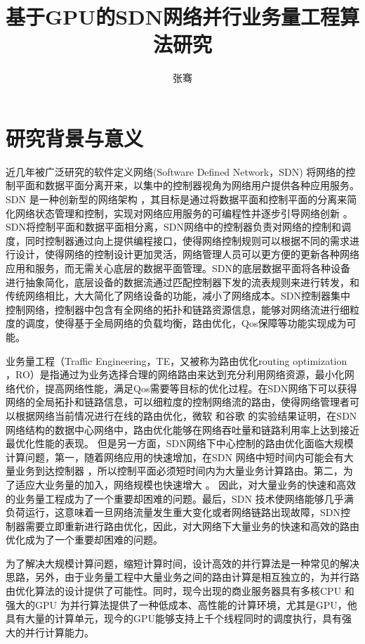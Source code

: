 \documentclass[master]{thesis-uestc}
\title{基于GPU的SDN网络并行业务量工程算法研究}
\author{张骞}
\begin{document}
\thesistableofcontents
\thesisfigurelist
\thesistablelist
\thesischapterexordium
\section{研究背景与意义}
近几年被广泛研究的软件定义网络(Software Defined Network，SDN) \cite{OpenFlow} \cite{SDN}将网络的控制平面和数据平面分离开来，以集中的控制器视角为网络用户提供各种应用服务。SDN 是一种创新型的网络架构 \cite{SDN2}，其目标是通过将数据平面和控制平面的分离来简化网络状态管理和控制，实现对网络应用服务的可编程性并逐步引导网络创新 \cite{SDN3}。SDN将控制平面和数据平面相分离，SDN网络中的控制器负责对网络的控制和调度，同时控制器通过向上提供编程接口，使得网络控制规则可以根据不同的需求进行设计，使得网络的控制设计更加灵活，网络管理人员可以更方便的更新各种网络应用和服务，而无需关心底层的数据平面管理。SDN的底层数据平面将各种设备进行抽象简化，底层设备的数据流通过匹配控制器下发的流表规则来进行转发，和传统网络相比，大大简化了网络设备的功能，减小了网络成本。SDN控制器集中控制网络，控制器中包含有全网络的拓扑和链路资源信息，能够对网络流进行细粒度的调度，使得基于全局网络的负载均衡，路由优化，Qos保障等功能实现成为可能。

业务量工程（Traffic Engineering，TE，又被称为路由优化routing optimization ，RO）是指通过为业务选择合理的网络路由来达到充分利用网络资源，最小化网络代价，提高网络性能，满足Qos需要等目标的优化过程。在SDN网络下可以获得网络的全局拓扑和链路信息，可以细粒度的控制网络流的路由，使得网络管理者可以根据网络当前情况进行在线的路由优化，微软 \cite{Microsoft}和谷歌 \cite{Google}的实验结果证明，在SDN网络结构的数据中心网络中，路由优化能够在网络吞吐量和链路利用率上达到接近最优化性能的表现。
但是另一方面，SDN网络下中心控制的路由优化面临大规模计算问题，第一，随着网络应用的快速增加，在SDN 网络中短时间内可能会有大量业务到达控制器 \cite{application}，所以控制平面必须短时间内为大量业务计算路由。第二，为了适应大业务量的加入，网络规模也快速增大\cite{5G} \cite{DCN}。 因此，对大量业务的快速和高效的业务量工程成为了一个重要却困难的问题。最后，SDN 技术使网络能够几乎满负荷运行\cite{Secondrouting}，这意味着一旦网络流量发生重大变化或者网络链路出现故障，SDN控制器需要立即重新进行路由优化，因此，对大网络下大量业务的快速和高效的路由优化成为了一个重要却困难的问题。

为了解决大规模计算问题，缩短计算时间，设计高效的并行算法是一种常见的解决思路，另外，由于业务量工程中大量业务之间的路由计算是相互独立的，为并行路由优化算法的设计提供了可能性。同时，现今出现的商业服务器具有多核CPU 和强大的GPU 为并行算法提供了一种低成本、高性能的计算环境，尤其是GPU，他具有大量的计算单元，现今的GPU能够支持上千个线程同时的调度执行，具有强大的并行计算能力。
\end{document}
